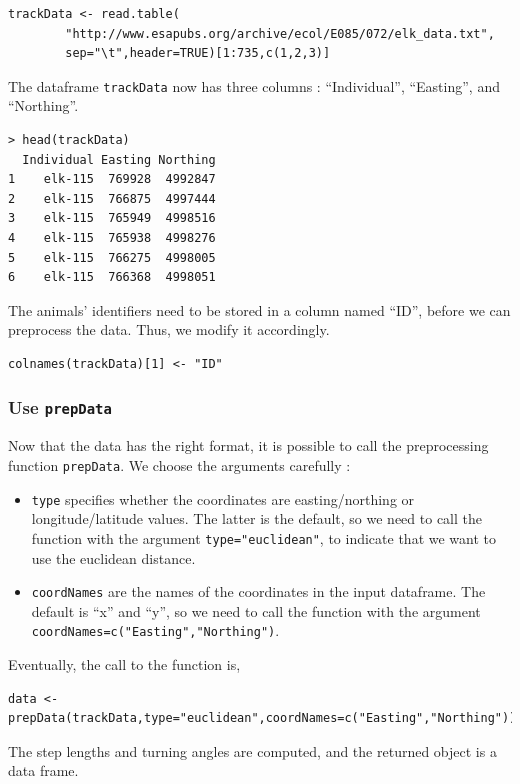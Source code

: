 \documentclass[]{article}
\begin{document}
\begin{lstlisting}
trackData <- read.table(
		"http://www.esapubs.org/archive/ecol/E085/072/elk_data.txt",
		sep="\t",header=TRUE)[1:735,c(1,2,3)]
\end{lstlisting}

The dataframe \texttt{trackData} now has three columns : ``Individual'', ``Easting'', and ``Northing''.

\begin{lstlisting}
> head(trackData)
  Individual Easting Northing
1    elk-115  769928  4992847
2    elk-115  766875  4997444
3    elk-115  765949  4998516
4    elk-115  765938  4998276
5    elk-115  766275  4998005
6    elk-115  766368  4998051
\end{lstlisting}

The animals' identifiers need to be stored in a column named ``ID'', before we can preprocess the data. Thus, we modify it accordingly.

\begin{lstlisting}
colnames(trackData)[1] <- "ID"
\end{lstlisting}

\subsubsection{Use \texttt{prepData}}
Now that the data has the right format, it is possible to call the preprocessing function \texttt{prepData}. We choose the arguments carefully :
\begin{itemize}
	\item \texttt{type} specifies whether the coordinates are easting/northing or longitude/latitude values. The latter is the default, so we need to call the function with the argument \texttt{type="euclidean"}, to indicate that we want to use the euclidean distance.
	\item \texttt{coordNames} are the names of the coordinates in the input dataframe. The default is ``x'' and ``y'', so we need to call the function with the argument \texttt{coordNames=c("Easting","Northing")}.
\end{itemize}

\noindent Eventually, the call to the function is,

\begin{lstlisting}
data <- prepData(trackData,type="euclidean",coordNames=c("Easting","Northing"))
\end{lstlisting}

The step lengths and turning angles are computed, and the returned object is a data frame.
\end{document}
